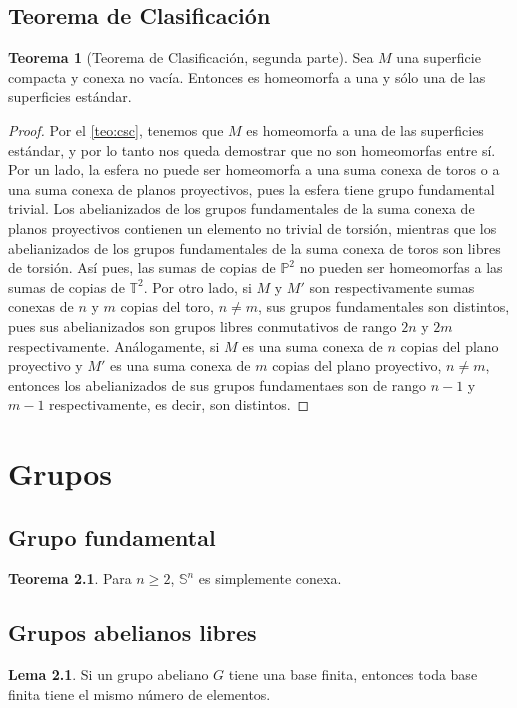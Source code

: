 \documentclass[10pt]{report}
\newcommand{\Toro}{\mathbb{T}^2}
\newcommand{\Proyectivo}{\mathbb{P}^2}
\theoremstyle{definition}
\newtheorem{tma}[defin]{Teorema}
\newtheorem{lema}[defin]{Lema}
\begin{document}
\section{Teorema de Clasificación}
\begin{tma}[Teorema de Clasificación, segunda parte]
Sea $M$ una superficie compacta y conexa no vacía. Entonces es homeomorfa a una y sólo una de las superficies estándar.
\end{tma}
\begin{proof}
Por el \autoref{teo:csc}, tenemos que $M$ es homeomorfa a una de las superficies estándar, y por lo tanto nos queda demostrar que no son homeomorfas entre sí. Por un lado, la esfera no puede ser homeomorfa a una suma conexa de toros o a una suma conexa de planos proyectivos, pues la esfera tiene grupo fundamental trivial. 
Los abelianizados de los grupos fundamentales de la suma conexa de planos proyectivos contienen un elemento no trivial de torsión, mientras que los abelianizados de los grupos fundamentales de la suma conexa de toros son libres de torsión. Así pues, las sumas de copias de $\Proyectivo$ no pueden ser homeomorfas a las sumas de copias de $\Toro$.
Por otro lado, si $M$ y $M'$ son respectivamente sumas conexas de $n$ y $m$ copias del toro, $n\neq m$, sus grupos fundamentales son distintos, pues sus abelianizados son grupos libres conmutativos de rango $2n$ y $2m$ respectivamente.
Análogamente, si $M$ es una suma conexa de $n$ copias del plano proyectivo y $M'$ es una suma conexa de $m$ copias del plano proyectivo, $n\neq m$, entonces los abelianizados de sus grupos fundamentaes son de rango $n-1$ y $m-1$ respectivamente, es decir, son distintos.
\end{proof}



\appendix

\chapter{Grupos}
\section{Grupo fundamental}
\begin{tma}
Para $n\geq 2$, $\mathbb{S}^n$ es simplemente conexa.
\end{tma}
\section{Grupos abelianos libres}
\begin{lema}
Si un grupo abeliano $G$ tiene una base finita, entonces toda base finita tiene el mismo número de elementos.
\end{lema}
\end{document}
